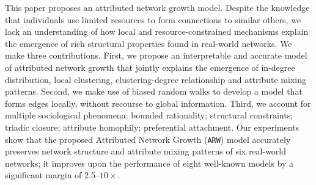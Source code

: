 
This paper proposes an attributed network growth model. Despite the knowledge
that individuals use limited resources to form connections to similar others, we
lack an understanding of how local and resource-constrained mechanisms explain
the emergence of rich structural properties found in real-world networks. We
make three contributions. First, we propose an interpretable and accurate model
of attributed network growth that jointly explains the emergence of in-degree
distribution, local clustering, clustering-degree relationship and attribute
mixing patterns. Second, we make use of biased random walks to develop a model
that forms edges locally, without recourse to global information. Third, we
account for multiple sociological phenomena: bounded rationality; structural
constraints; triadic closure; attribute homophily; preferential attachment.
Our experiments show that the proposed Attributed Network Growth (\texttt{ARW}) model
accurately preserves network structure and attribute mixing patterns of
six real-world networks; it improves upon the performance of eight
well-known models by a significant margin of
2.5--$10\times$.


